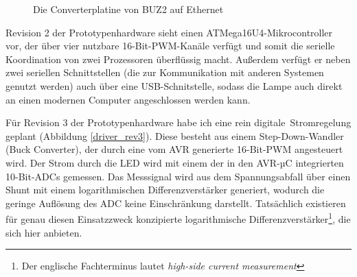 \documentclass[12pt,a4paper,notitlepage]{article}
\begin{document}
\begin{figure}
\centering
{}
\caption{Die Converterplatine von BUZ2 auf Ethernet}
\label{buz2_converter_ethernet}
\end{figure}

Revision 2 der Prototypenhardware sieht einen ATMega16U4-Mikrocontroller vor, der über vier nutzbare 16-Bit-PWM-Kanäle verfügt und somit die serielle Koordination von zwei Prozessoren überflüssig macht. Außerdem verfügt er neben zwei seriellen Schnittstellen (die zur Kommunikation mit anderen Systemen genutzt werden) auch über eine USB-Schnitstelle, sodass die Lampe auch direkt an einen modernen Computer angeschlossen werden kann.

Für Revision 3 der Prototypenhardware habe ich eine rein \glqq digitale\grqq\ Stromregelung geplant (Abbildung \ref{driver_rev3}). Diese besteht aus einem Step-Down-Wandler (Buck Converter)\cite{MAXIM24,MAXIM70,NATIONAL4,SPRUT1,MAXIM49},%
der durch eine vom AVR generierte 16-Bit-PWM angesteuert wird. Der Strom durch die LED wird mit einem der in den AVR-µC integrierten 10-Bit-ADCs gemessen. Das Messsignal wird aus dem Spannungsabfall über einen Shunt %
mit einem logarithmischen Differenzverstärker generiert\cite{MAXIM34}, wodurch die geringe Auflösung des ADC keine Einschränkung darstellt. Tatsächlich existieren für genau diesen Einsatzzweck konzipierte logarithmische Differenzverstärker\footnote{Der englische Fachterminus lautet \emph{high-side current measurement}}, die sich hier anbieten.
\end{document}
